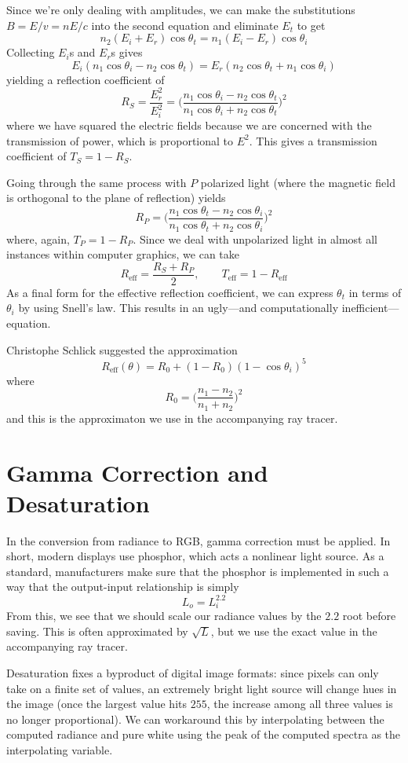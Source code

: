 \documentclass{article}
\begin{document}
Since we're only dealing with amplitudes, we can make the substitutions $B = E/v = nE/c$ into the second equation and eliminate $E_t$ to get
\[
	n_2(E_i + E_r)\cos\theta_t = n_1(E_i - E_r)\cos\theta_i
\]
Collecting $E_i$s and $E_r$s gives
\[
	E_i(n_1\cos\theta_i - n_2\cos\theta_t) = E_r(n_2\cos\theta_t + n_1\cos\theta_i)
\]
yielding a reflection coefficient of
\[
	R_S = \frac{E_r^2}{E_i^2} = \Big(\frac{n_1\cos\theta_i - n_2\cos\theta_t}{n_1\cos\theta_i + n_2\cos\theta_t}\Big)^2
\]
where we have squared the electric fields because we are concerned with the transmission of power, which is proportional to $E^2$. This gives a transmission coefficient of $T_S = 1 - R_S$.

Going through the same process with $P$ polarized light (where the magnetic field is orthogonal to the plane of reflection) yields
\[
	R_P = \Big(\frac{n_1\cos\theta_t - n_2\cos\theta_i}{n_1\cos\theta_t + n_2\cos\theta_i}\Big)^2
\]
where, again, $T_P = 1 - R_P$. Since we deal with unpolarized light in almost all instances within computer graphics, we can take
\[
	R_{\text{eff}} = \frac{R_S + R_P}{2}, \qquad T_{\text{eff}} = 1 - R_{\text{eff}}
\]
As a final form for the effective reflection coefficient, we can express $\theta_t$ in terms of $\theta_i$ by using Snell's law. This results in an ugly---and computationally inefficient---equation.

Christophe Schlick suggested the approximation
\[
	R_{\text{eff}}(\theta) = R_0 + (1 - R_0)(1 - \cos\theta_i)^5
\]
where
\[
	R_0 = \Big(\frac{n_1 - n_2}{n_1 + n_2}\Big)^2
\]
and this is the approximaton we use in the accompanying ray tracer.

\section*{Gamma Correction and Desaturation}

In the conversion from radiance to RGB, gamma correction must be applied. In short, modern displays use phosphor, which acts a nonlinear light source. As a standard, manufacturers make sure that the phosphor is implemented in such a way that the output-input relationship is simply
\[
	L_o = L_i^{2.2}
\]
From this, we see that we should scale our radiance values by the $2.2$ root before saving. This is often approximated by $\sqrt{L}$, but we use the exact value in the accompanying ray tracer.

Desaturation fixes a byproduct of digital image formats: since pixels can only take on a finite set of values, an extremely bright light source will change hues in the image (once the largest value hits $255$, the increase among all three values is no longer proportional). We can workaround this by interpolating between the computed radiance and pure white using the peak of the computed spectra as the interpolating variable.
\end{document}
